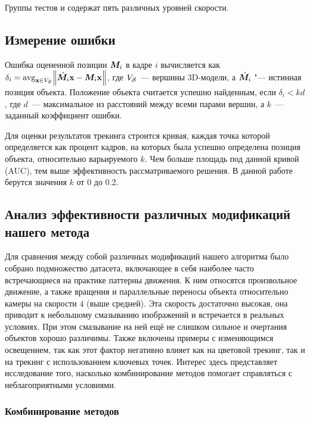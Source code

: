 
Группы тестов  и  содержат пять различных
уровней скорости.

\subsection{Измерение ошибки}

Ошибка оцененной позиции $\bm{M}_i$ в кадре $i$ вычисляется как
$
\delta_i = \operatorname*{avg}_{\mathbf{x} \in V_{\mathcal{S}}} \norm{\hat{\bm{M}_i} \mathbf{x} - \bm{M}_i
\mathbf{x}}
$,
где $V_{\mathcal{S}}$~--- вершины 3D-модели,
а $\hat{\bm{M}_i}$ "--- истинная позиция объекта.
Положение объекта считается успешно найденным, если $\delta_i < k d$, где
$d$~--- максимальное из расстояний между всеми парами вершин, а $k$~---
заданный коэффициент ошибки.

Для оценки результатов трекинга строится кривая, каждая точка которой
определяется как процент кадров, на которых была успешно определена позиция
объекта, относительно варьируемого $k$.
Чем больше площадь под данной кривой (AUC), тем выше эффективность
рассматриваемого решения.
В данной работе берутся значения $k$ от 0 до 0.2.

\subsection{Анализ эффективности различных модификаций нашего метода}
Для сравнения между собой различных модификаций нашего алгоритма было собрано
подмножество датасета, включающее в себя наиболее часто встречающиеся на
практике паттерны движения.
К ним относятся произвольное движение, а также вращения и параллельные переносы
объекта относительно камеры на скорости $4$ (выше средней).
Эта скорость достаточно высокая, она приводит к небольшому смазыванию
изображений и встречается в реальных условиях.
При этом смазывание на ней ещё не слишком сильное и очертания объектов хорошо
различимы.
Также включены примеры с изменяющимся освещением, так как этот фактор негативно
влияет как на цветовой трекинг, так и на трекинг с использованием ключевых
точек.
Интерес здесь представляет исследование того, насколько комбинирование методов
помогает справляться с неблагоприятными условиями.

\subsubsection{Комбинирование методов}

